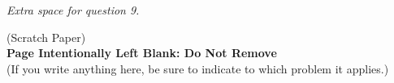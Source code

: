 \documentclass[letterpaper]{article}
\begin{document}


\newpage

\newpage
\textit{Extra space for question 9.}

\newpage
\vspace*{2cm}

\begin{center}
(Scratch Paper)\\
{\bf \LARGE Page Intentionally Left Blank: Do Not Remove}\\
(If you write anything here, be sure to indicate to which problem it applies.)

\end{center}



\end{document}
